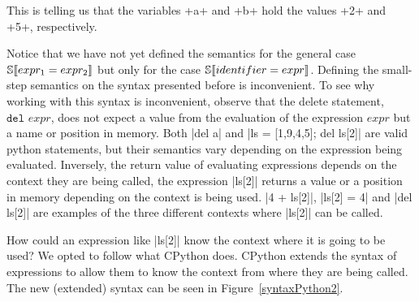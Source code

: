 This is telling us that the variables \pycode+a+ and \pycode+b+ hold the values
\pycode+2+ and \pycode+5+, respectively.

Notice that we have not yet defined the semantics for the general case
$\mathbb{S}\!\left\llbracket expr_1 = expr_2 \right\rrbracket$ but only for the case $\mathbb{S}\!\left\llbracket identifier = expr \right\rrbracket$.
Defining the small-step semantics on the syntax presented before is inconvenient. To see
why working with this syntax is inconvenient, observe that the delete statement,
$\texttt{del } expr$, does not expect a value from the evaluation of the expression
$expr$ but a name or position in memory.  Both \pycode|del a| and \pycode|ls = [1,9,4,5];
del ls[2]| are valid python statements, but their semantics vary depending on the
expression being evaluated. Inversely, the return value of evaluating expressions depends
on the context they are being called, the expression \pycode|ls[2]| returns a value or a
position in memory depending on the context is being used. \pycode|4 + ls[2]|,
\pycode|ls[2] = 4| and \pycode|del ls[2]| are examples of the three different contexts
where \pycode|ls[2]| can be called.

How could an expression like \pycode|ls[2]| know the context where it is going to be used?
We opted to follow what CPython does. CPython extends the syntax of expressions to allow
them to know the context from where they are being called. The new (extended) syntax can be
seen in Figure~\ref{syntaxPython2}.

